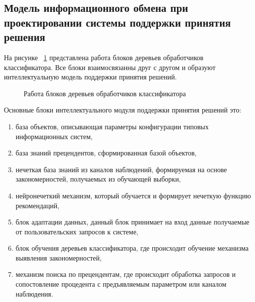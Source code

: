 \subsection{Модель информационного обмена при проектировании системы поддержки принятия решения}\label{sec:ch2/sec3/sub3}
На рисунке ~\cref{fig:NNmodel} представлена работа блоков деревьев обработчиков классификатора. Все блоки взаимосвязанны друг с другом и образуют интеллектуальную модель поддержки принятия решений.
\begin{figure}[ht]
    \caption{Работа блоков деревьев обработчиков классификатора}\label{fig:NNmodel}
\end{figure}

Основные блоки интеллектуального модуля поддержки принятия решений это:

\begin{enumerate}
    \item база объектов, описывающая параметры конфигурации типовых информационных систем,
    \item база знаний прецендентов, сформированная базой объектов,
    \item нечеткая база знаний из каналов наблюдений, формируемая на основе закономерностей, получаемых из обучающей выборки,
    \item нейронечеткий механизм, который обучается и формирует нечеткую функцию рекомендаций,
    \item блок адаптации данных, данный блок принимает на вход данные получаемые от пользовательских запросов к системе,
    \item блок обучения деревьев классификатора, где происходит обучение механизма выявления закономерностей,
    \item механизм поиска по прецендентам, где происходит обработка запросов и сопостовление процедента с предъявляемым параметром или каналом наблюдения.
\end{enumerate}

